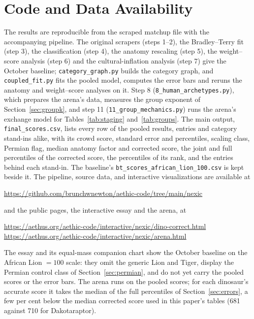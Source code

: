 \documentclass[11pt]{article}
\begin{document}
\section{Code and Data Availability}
\label{sec:code}
The results are reproducible from the scraped matchup file with the accompanying pipeline. The original scrapers (steps 1--2), the Bradley--Terry fit (step 3), the classification (step 4), the anatomy rescaling (step 5), the weight--score analysis (step 6) and the cultural-inflation analysis (step 7) give the October baseline; \texttt{category\_graph.py} builds the category graph, and \texttt{coupled\_fit.py} fits the pooled model, computes the error bars and reruns the anatomy and weight--score analyses on it. Step 8 (\texttt{8\_human\_archetypes.py}), which prepares the arena's data, measures the group exponent of Section~\ref{sec:groupk}, and step 11 (\texttt{11\_group\_mechanics.py}) runs the arena's exchange model for Tables~\ref{tab:staging} and~\ref{tab:groups}. The main output, \texttt{final\_scores.csv}, lists every row of the pooled results, entries and category stand-ins alike, with its crowd score, standard error and percentiles, scaling class, Permian flag, median anatomy factor and corrected score, the joint and full percentiles of the corrected score, the percentiles of its rank, and the entries behind each stand-in. The baseline's \texttt{bt\_scores\_african\_lion\_100.csv} is kept beside it. The pipeline, source data, and interactive visualizations are available at
\begin{center}
\url{https://github.com/brunchwnewton/aethic-code/tree/main/nexic}
\end{center}
and the public pages, the interactive essay and the arena, at
\begin{center}
\url{https://aethus.org/aethic-code/interactive/nexic/dino-correct.html}\\
\url{https://aethus.org/aethic-code/interactive/nexic/arena.html}
\end{center}
The essay and its equal-mass companion chart show the October baseline on the African Lion $=100$ scale: they omit the generic Lion and Tiger, display the Permian control class of Section~\ref{sec:permian}, and do not yet carry the pooled scores or the error bars. The arena runs on the pooled scores; for each dinosaur's accurate score it takes the median of the full percentiles of Section~\ref{sec:errors}, a few per cent below the median corrected score used in this paper's tables (681 against 710 for Dakotaraptor).
\end{document}

